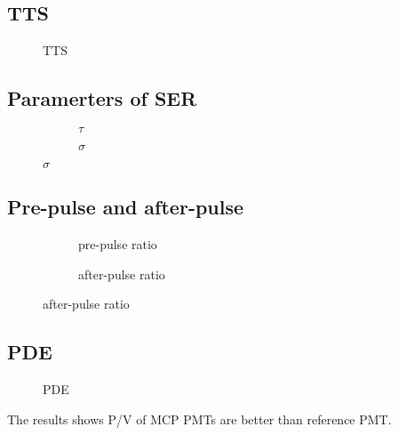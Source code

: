 \subsection{TTS}
\begin{figure}[!htbp]
    \centering
    \caption{TTS}
    \label{fig:TTSCompare}
\end{figure}
\subsection{Paramerters of SER}
\begin{figure}[!htbp]
    \centering
    \begin{subfigure}[b]{0.47\textwidth}
        \caption{$\tau$}
        \label{fig:tauCompare}
    \end{subfigure}
    \begin{subfigure}[b]{0.47\textwidth}
        \caption{$\sigma$}
        \label{fig:sigmaCompare}
    \end{subfigure}
\end{figure}
\subsection{Pre-pulse and after-pulse}
\begin{figure}[!htbp]
    \centering
    \begin{subfigure}[b]{0.47\textwidth}
        \caption{pre-pulse ratio}
        \label{fig:prepulseCompare}
    \end{subfigure}
    \begin{subfigure}[b]{0.47\textwidth}
        \caption{after-pulse ratio}
        \label{fig:afterpulseCompare}
    \end{subfigure}
\end{figure}
\subsection{PDE}
\begin{figure}[!htbp]
    \centering
    \caption{PDE}
    \label{fig:PDECompare}
\end{figure}
The results shows P/V of MCP PMTs are better than reference PMT.

